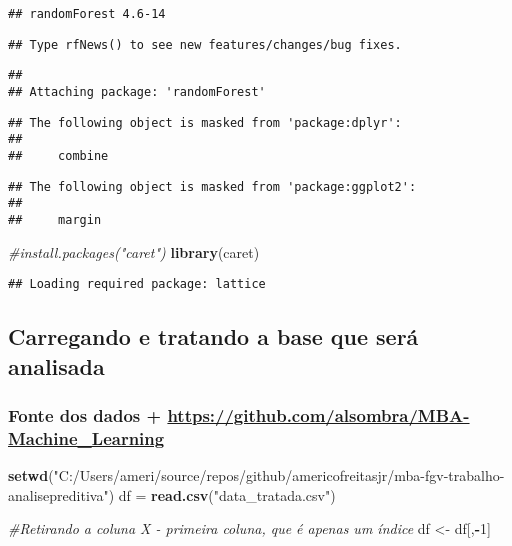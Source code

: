 \documentclass[]{article}
\newenvironment{Shaded}{\begin{snugshade}}{\end{snugshade}}
\newcommand{\KeywordTok}[1]{\textcolor[rgb]{0.13,0.29,0.53}{\textbf{#1}}}
\newcommand{\DecValTok}[1]{\textcolor[rgb]{0.00,0.00,0.81}{#1}}
\newcommand{\StringTok}[1]{\textcolor[rgb]{0.31,0.60,0.02}{#1}}
\newcommand{\CommentTok}[1]{\textcolor[rgb]{0.56,0.35,0.01}{\textit{#1}}}
\newcommand{\OperatorTok}[1]{\textcolor[rgb]{0.81,0.36,0.00}{\textbf{#1}}}
\newcommand{\NormalTok}[1]{#1}
\begin{document}
\begin{verbatim}
## randomForest 4.6-14
\end{verbatim}

\begin{verbatim}
## Type rfNews() to see new features/changes/bug fixes.
\end{verbatim}

\begin{verbatim}
## 
## Attaching package: 'randomForest'
\end{verbatim}

\begin{verbatim}
## The following object is masked from 'package:dplyr':
## 
##     combine
\end{verbatim}

\begin{verbatim}
## The following object is masked from 'package:ggplot2':
## 
##     margin
\end{verbatim}

\begin{Shaded}
\begin{Highlighting}[]
\CommentTok{#install.packages("caret")}
\KeywordTok{library}\NormalTok{(caret)}
\end{Highlighting}
\end{Shaded}

\begin{verbatim}
## Loading required package: lattice
\end{verbatim}

\subsection{Carregando e tratando a base que será
analisada}\label{carregando-e-tratando-a-base-que-sera-analisada}

\subsubsection{\texorpdfstring{Fonte dos dados +
\url{https://github.com/alsombra/MBA-Machine_Learning}}{Fonte dos dados + https://github.com/alsombra/MBA-Machine\_Learning}}\label{fonte-dos-dados-httpsgithub.comalsombramba-machine_learning}

\begin{Shaded}
\begin{Highlighting}[]
\KeywordTok{setwd}\NormalTok{(}\StringTok{"C:/Users/ameri/source/repos/github/americofreitasjr/mba-fgv-trabalho-analisepreditiva"}\NormalTok{)}
\NormalTok{df =}\StringTok{ }\KeywordTok{read.csv}\NormalTok{(}\StringTok{"data_tratada.csv"}\NormalTok{)}

\CommentTok{#Retirando a coluna X - primeira coluna, que é apenas um índice}
\NormalTok{df <-}\StringTok{ }\NormalTok{df[,}\OperatorTok{-}\DecValTok{1}\NormalTok{] }
\end{Highlighting}
\end{Shaded}
\end{document}
